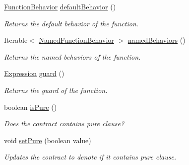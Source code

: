 \begin{DoxyCompactItemize}
\item 
\hyperlink{interfaceedu_1_1udel_1_1cis_1_1vsl_1_1civl_1_1model_1_1IF_1_1contract_1_1FunctionBehavior}{Function\+Behavior} \hyperlink{interfaceedu_1_1udel_1_1cis_1_1vsl_1_1civl_1_1model_1_1IF_1_1contract_1_1FunctionContract_a22e7da9919f22c9409e06431b87d05ba}{default\+Behavior} ()
\begin{DoxyCompactList}\small\item\em Returns the default behavior of the function. \end{DoxyCompactList}\item 
Iterable$<$ \hyperlink{interfaceedu_1_1udel_1_1cis_1_1vsl_1_1civl_1_1model_1_1IF_1_1contract_1_1NamedFunctionBehavior}{Named\+Function\+Behavior} $>$ \hyperlink{interfaceedu_1_1udel_1_1cis_1_1vsl_1_1civl_1_1model_1_1IF_1_1contract_1_1FunctionContract_a78e4850fe2bf086f2fdec084e7a6aa9e}{named\+Behaviors} ()
\begin{DoxyCompactList}\small\item\em Returns the named behaviors of the function. \end{DoxyCompactList}\item 
\hyperlink{interfaceedu_1_1udel_1_1cis_1_1vsl_1_1civl_1_1model_1_1IF_1_1expression_1_1Expression}{Expression} \hyperlink{interfaceedu_1_1udel_1_1cis_1_1vsl_1_1civl_1_1model_1_1IF_1_1contract_1_1FunctionContract_a2513b5fbfde857997bb390333615b0c8}{guard} ()
\begin{DoxyCompactList}\small\item\em Returns the guard of the function. \end{DoxyCompactList}\item 
boolean \hyperlink{interfaceedu_1_1udel_1_1cis_1_1vsl_1_1civl_1_1model_1_1IF_1_1contract_1_1FunctionContract_aff9a5fb6736b546328b2f118f152ff5e}{is\+Pure} ()
\begin{DoxyCompactList}\small\item\em Does the contract contains {\ttfamily pure} clause? \end{DoxyCompactList}\item 
void \hyperlink{interfaceedu_1_1udel_1_1cis_1_1vsl_1_1civl_1_1model_1_1IF_1_1contract_1_1FunctionContract_a3c48a4d4395c17f6415f43ece99f1b36}{set\+Pure} (boolean value)
\begin{DoxyCompactList}\small\item\em Updates the contract to denote if it contains {\ttfamily pure} clause. \end{DoxyCompactList}\item 

\end{DoxyCompactItemize}
